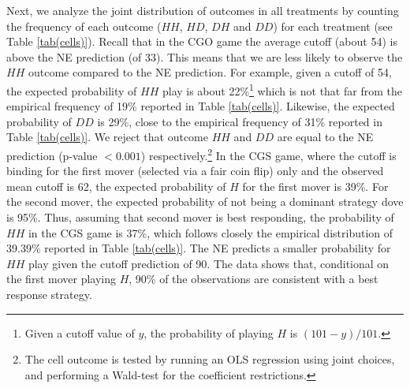 \documentclass[12pt, letterpaper]{article}
\theoremstyle{plain}
\begin{document}
Next, we analyze the joint distribution of outcomes in all treatments by counting the frequency of each outcome ($HH$, $HD$, $DH$ and $DD$) for each treatment (see Table \ref{tab(cells)}). Recall that in the CGO game the average cutoff (about 54) is above the NE prediction (of 33). This means that we are less likely to observe the $HH$ outcome compared to the NE prediction. For example, given a cutoff of 54, the expected probability of $HH$ play is  about 22\%\footnote{Given a cutoff value of $y$, the probability of playing $H$ is $(101-y)/101$.} which is not that far from the empirical frequency of 19\% reported in Table \ref{tab(cells)}. Likewise, the expected probability of $DD$ is 29\%, close to the empirical frequency of 31\% reported in Table \ref{tab(cells)}. We reject that outcome  $HH$ and $DD$ are equal to the NE prediction (p-value $< 0.001$) respectively.\footnote{The cell outcome is tested by running an OLS regression using joint choices, and performing a Wald-test for the coefficient restrictions.} In the CGS game, where the cutoff is binding for the first mover (selected via a fair coin flip) only and the observed mean cutoff is 62, the expected probability of $H$ for the first mover is 39\%. For the second mover, the expected probability of not being a dominant strategy dove is 95\%. Thus, assuming that second mover is best responding, the probability of $HH$ in the CGS game is 37\%, which follows closely the empirical distribution of 39.39\% reported in Table \ref{tab(cells)}. The NE predicts a smaller probability for $HH$ play given the cutoff prediction of 90. The data shows that, conditional on the first mover playing $H$, 90\% of the observations are consistent with a best response strategy.
\end{document}
